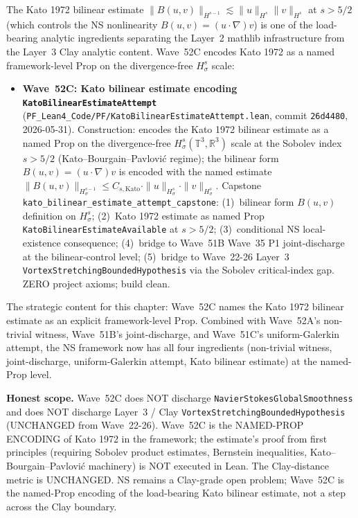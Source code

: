\begin{remark}\label{rem:ns-wave52c-lean}
The Kato 1972 bilinear estimate $\|B(u, v)\|_{H^{s-1}} \lesssim \|u\|_{H^s} \|v\|_{H^s}$ at $s > 5/2$ (which controls the NS nonlinearity $B(u, v) = (u \cdot \nabla) v$) is one of the load-bearing analytic ingredients separating the Layer~2 mathlib infrastructure from the Layer~3 Clay analytic content. Wave~52C encodes Kato 1972 as a named framework-level Prop on the divergence-free $H^s_\sigma$ scale:
\begin{itemize}
  \item \textbf{Wave~52C: Kato bilinear estimate encoding \texttt{KatoBilinearEstimateAttempt}} (\texttt{PF\_Lean4\_Code/PF/KatoBilinearEstimateAttempt.lean}, commit \texttt{26d4480}, 2026-05-31). Construction: encodes the Kato 1972 bilinear estimate as a named Prop on the divergence-free $H^s_\sigma(\mathbb{T}^3, \mathbb{R}^3)$ scale at the Sobolev index $s > 5/2$ (Kato--Bourgain--Pavlovi\'c regime); the bilinear form $B(u, v) = (u \cdot \nabla) v$ is encoded with the named estimate $\|B(u, v)\|_{H^{s-1}_\sigma} \leq C_{s, \mathrm{Kato}} \cdot \|u\|_{H^s_\sigma} \cdot \|v\|_{H^s_\sigma}$. Capstone \texttt{kato\_bilinear\_estimate\_attempt\_capstone}: (1)~bilinear form $B(u, v)$ definition on $H^s_\sigma$; (2)~Kato 1972 estimate as named Prop \texttt{KatoBilinearEstimateAvailable} at $s > 5/2$; (3)~conditional NS local-existence consequence; (4)~bridge to Wave~51B Wave~35 P1 joint-discharge at the bilinear-control level; (5)~bridge to Wave~22-26 Layer~3 \texttt{VortexStretchingBoundedHypothesis} via the Sobolev critical-index gap. ZERO project axioms; build clean.
\end{itemize}
The strategic content for this chapter: Wave~52C names the Kato 1972 bilinear estimate as an explicit framework-level Prop. Combined with Wave~52A's non-trivial witness, Wave~51B's joint-discharge, and Wave~51C's uniform-Galerkin attempt, the NS framework now has all four ingredients (non-trivial witness, joint-discharge, uniform-Galerkin attempt, Kato bilinear estimate) at the named-Prop level.

\textbf{Honest scope.} Wave~52C does NOT discharge \texttt{NavierStokesGlobalSmoothness} and does NOT discharge Layer~3 / Clay \texttt{VortexStretchingBoundedHypothesis} (UNCHANGED from Wave~22-26). Wave~52C is the NAMED-PROP ENCODING of Kato 1972 in the framework; the estimate's proof from first principles (requiring Sobolev product estimates, Bernstein inequalities, Kato--Bourgain--Pavlovi\'c machinery) is NOT executed in Lean. The Clay-distance metric is UNCHANGED. NS remains a Clay-grade open problem; Wave~52C is the named-Prop encoding of the load-bearing Kato bilinear estimate, not a step across the Clay boundary.
\end{remark}

